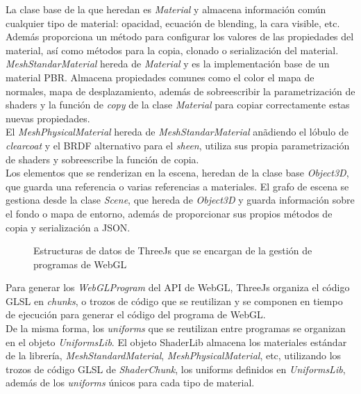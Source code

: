 La clase base de la que heredan es \textit{Material} y almacena informaci\'on com\'un
cualquier tipo de material: opacidad, ecuaci\'on de blending, la cara visible, etc. Adem\'as proporciona un m\'etodo
para configurar los valores de las propiedades del material, as\'i como m\'etodos para la copia, clonado o serializaci\'on
del material.\\

\textit{MeshStandarMaterial} hereda de \textit{Material} y es la implementaci\'on base de un material PBR. Almacena propiedades comunes
como el color el mapa de normales, mapa de desplazamiento, adem\'as de sobreescribir la parametrizaci\'on de shaders y la funci\'on de \textit{copy} de la clase \textit{Material} para copiar correctamente
estas nuevas propiedades.\\

El \textit{MeshPhysicalMaterial} hereda de \textit{MeshStandarMaterial} an\~adiendo el l\'obulo de \textit{clearcoat} y
el BRDF alternativo para el \textit{sheen}, utiliza sus propia parametrizaci\'on de shaders y sobreescribe la funci\'on de copia.\\

Los elementos que se renderizan en la escena, heredan de la clase base \textit{Object3D}, que guarda una referencia o varias
referencias a materiales. El grafo de escena se gestiona desde la clase \textit{Scene}, que hereda de \textit{Object3D} y guarda
informaci\'on sobre el fondo o mapa de entorno, adem\'as de proporcionar sus propios m\'etodos de copia y serializaci\'on
a JSON.

\begin{figure}[H]
  \centering
  \caption{Estructuras de datos de ThreeJs que se encargan de la gesti\'on de programas de WebGL}
  \vspace{0.5cm}
\end{figure}

Para generar los \textit{WebGLProgram} del API de WebGL, ThreeJs organiza el c\'odigo GLSL en \textit{chunks}, o trozos de c\'odigo
que se reutilizan y se componen en tiempo de ejecuci\'on para generar el c\'odigo del programa de WebGL.\\

De la misma forma, los \textit{uniforms} que se reutilizan entre programas se organizan en el objeto \textit{UniformsLib}. El objeto ShaderLib almacena
los materiales est\'andar de la librer\'ia, \textit{MeshStandardMaterial}, \textit{MeshPhysicalMaterial}, etc, utilizando los trozos
de c\'odigo GLSL de \textit{ShaderChunk}, los uniforms definidos en \textit{UniformsLib}, adem\'as de los \textit{uniforms} \'unicos
para cada tipo de material.\\

